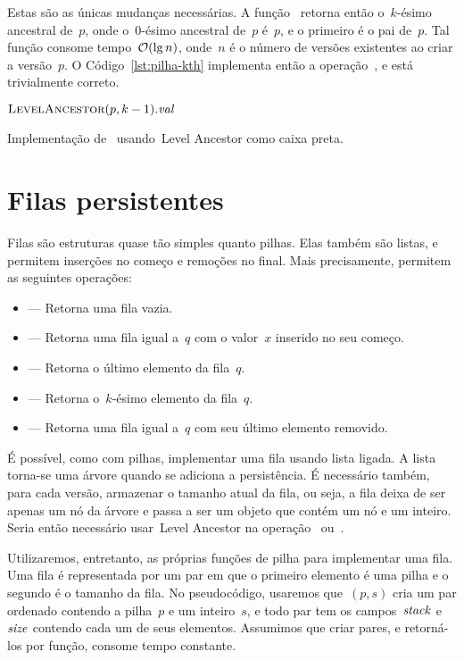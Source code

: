 \documentclass[main.tex]{subfiles}
\begin{document}
Estas são as únicas mudanças necessárias. A função~ retorna então o~\mbox{$k$-ésimo} ancestral de~$p$, onde o~0-ésimo ancestral de~$p$ é~$p$, e o primeiro é o pai de~$p$. Tal função consome tempo~$\mathcal{O}(\lg n)$, onde~$n$ é o número de versões existentes ao criar a versão~$p$.
O Código~\ref{lst:pilha-kth} implementa então a operação~, e está trivialmente correto.

\begin{algorithm}
\begin{algorithmic}[1]
    \State \Return $\Call{LevelAncestor}{p, k - 1}.\V{val}$
\EndFunction
\end{algorithmic}
\caption{Implementação de~ usando~Level Ancestor como caixa preta.} \label{lst:pilha-kth}
\end{algorithm}

\section{Filas persistentes}

Filas são estruturas quase tão simples quanto pilhas. Elas também são listas, e permitem inserções no começo e remoções no final. Mais precisamente, permitem as seguintes operações:

\begin{itemize}
	\item {} --- Retorna uma fila vazia.
	\item {} --- Retorna uma fila igual a~$q$ com o valor~$x$ inserido no seu começo.
	\item {} --- Retorna o último elemento da fila~$q$.
	\item {} --- Retorna o~\mbox{$k$-ésimo} elemento da fila~$q$.
	\item {} --- Retorna uma fila igual a~$q$ com seu último elemento removido.
\end{itemize}

É possível, como com pilhas, implementar uma fila usando lista ligada. A lista torna-se uma árvore quando se adiciona a persistência. É necessário também, para cada versão, armazenar o tamanho atual da fila, ou seja, a fila deixa de ser apenas um nó da árvore e passa a ser um objeto que contém um nó e um inteiro. Seria então necessário usar~Level Ancestor na operação~ ou~.

Utilizaremos, entretanto, as próprias funções de pilha para implementar uma fila. Uma fila é representada por um par em que o primeiro elemento é uma pilha e o segundo é o tamanho da fila. No pseudocódigo, usaremos que~$(p,s)$ cria um par ordenado contendo a pilha~$p$ e um inteiro~$s$, e todo par tem os campos~$\mathit{stack}$ e~$\mathit{size}$ contendo cada um de seus elementos.
Assumimos que criar pares, e retorná-los por função, consome tempo constante.
\end{document}
